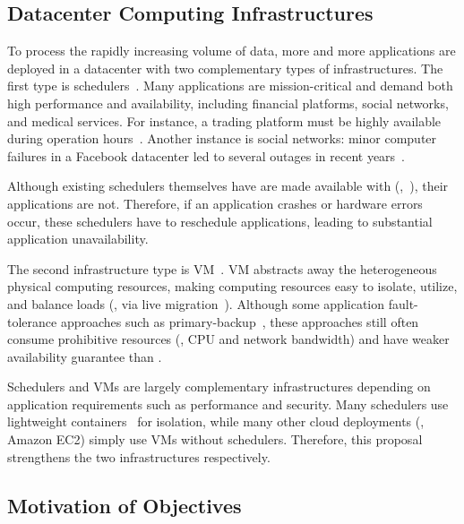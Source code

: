 \vspace{-.15in}\subsection{Datacenter Computing Infrastructures}
\label{sec:datacenter}\vspace{-.075in}



To process the rapidly increasing volume of data, more and more applications 
are deployed in a datacenter with two complementary types of infrastructures. 
The first type is schedulers~\cite{borg:eurosys15,mesos:nsdi11,tupperware, 
yarn:socc13, autopilot:sosp07,quincy:sosp09,apollo:osdi14,fuxi:vldb14}. Many 
applications are mission-critical and demand both high performance
and availability, including financial platforms, social networks, 
and medical services. For instance, a trading platform must be highly available 
during operation hours~\cite{nosql:finance}. Another instance is social 
networks: minor computer failures in a Facebook datacenter led to several 
outages in recent years~\cite{facebook:outage}.


Although existing schedulers themselves have are made available with 
\paxos (\eg,~\cite{mesos:nsdi11}), their applications are not. Therefore, if an 
application crashes or hardware errors occur, these schedulers have to 
reschedule applications, leading to substantial application unavailability.

% 
The second infrastructure type is VM~\cite{amazon:vpc, openstack, esx:osdi02, 
kvm, xen:sosp}. VM abstracts away the heterogeneous physical computing 
resources, making computing resources easy to isolate, utilize, and balance 
loads (\eg, via live migration~\cite{vmotion:atc05,xen:migration:nsdi05}). 
Although some application fault-tolerance approaches such as 
primary-backup~\cite{remus:nsdi08}, these approaches still often consume 
prohibitive resources (\eg, CPU and network bandwidth) and have weaker 
availability guarantee than \paxos.

Schedulers and VMs are largely complementary infrastructures depending on 
application requirements such as performance and security. Many schedulers 
use lightweight containers~\cite{docker,lxc} for isolation, while many other 
cloud deployments (\eg, Amazon EC2) simply use VMs without schedulers. 
Therefore, this proposal strengthens the two infrastructures respectively.


\vspace{-.15in}\subsection{Motivation of Objectives} 
\label{sec:motivation}\vspace{-.075in}

